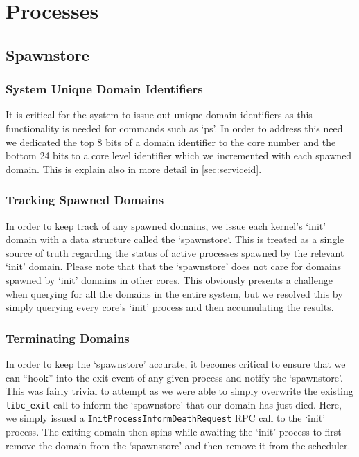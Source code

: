 \chapter{Processes}

\section{Spawnstore}
\subsection{System Unique Domain Identifiers}
It is critical for the system to issue out unique domain identifiers as this functionality is needed for commands such as `ps'. In order to address this need we dedicated the top 8 bits of a domain identifier to the core number and the bottom 24 bits to a core level identifier which we incremented with each spawned domain. This is explain also in more detail in \autoref{sec:serviceid}.

\subsection{Tracking Spawned Domains}
In order to keep track of any spawned domains, we issue each kernel's `init' domain with a data structure called the `spawnstore`. This is treated as a single source of truth regarding the status of active processes spawned by the relevant `init' domain. Please note that that the `spawnstore' does not care for domains spawned by `init' domains in other cores. This obviously presents a challenge when querying for all the domains in the entire system, but we resolved this by simply querying every core's `init' process and then accumulating the results. 

\subsection{Terminating Domains}
In order to keep the `spawnstore' accurate, it becomes critical to ensure that we can ``hook'' into the exit event of any given process and notify the `spawnstore'. This was fairly trivial to attempt as we were able to simply overwrite the existing \texttt{libc_exit} call to inform the `spawnstore' that our domain has just died. Here, we simply issued a \texttt{InitProcessInformDeathRequest} RPC call to the `init' process. The exiting domain then spins while awaiting the `init' process to first remove the domain from the `spawnstore' and then remove it from the scheduler. 


